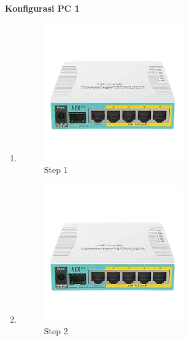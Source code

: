 \begin{center} 
	\textbf{Konfigurasi PC 1}
\end{center}

\begin{enumerate}
	\item 
	
	\begin{figure}[H]
		\centering
		\includegraphics[width=0.7\linewidth]{P1/img/contoh.png}
		\caption{Step 1}
		\label{fig:gambar1}
	\end{figure}

	\item 
	
	\begin{figure}[H]
		\centering
		\includegraphics[width=0.7\linewidth]{P1/img/contoh.png}
		\caption{Step 2}
		\label{fig:gambar1}
	\end{figure}


\end{enumerate}
